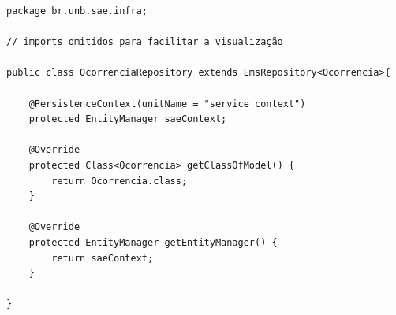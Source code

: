              
\renewcommand{\lstlistingname}{Código}             
\begin{lstlisting}[caption=Exemplo de implementação do repositório QuestionarioRepository., label=fig:exemplo_repository]
package br.unb.sae.infra;

// imports omitidos para facilitar a visualização

public class OcorrenciaRepository extends EmsRepository<Ocorrencia>{
	
	@PersistenceContext(unitName = "service_context")
	protected EntityManager saeContext;
	
	@Override
	protected Class<Ocorrencia> getClassOfModel() {
		return Ocorrencia.class;
	}

	@Override
	protected EntityManager getEntityManager() {
		return saeContext;
	}

}
\end{lstlisting}


             
